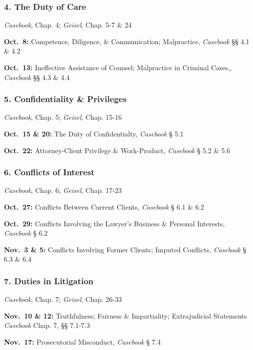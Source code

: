 \documentclass[11pt,letterpaper,twoside]{article}
\begin{document}
\subsubsection{4. The Duty of Care}\label{the-duty-of-care}

\emph{Casebook}, Chap. 4; \emph{Geisel}, Chap. 5-7 \& 24

\textbf{Oct.~8:} Competence, Diligence, \& Communication; Malpractice,
\emph{Casebook} §§ 4.1 \& 4.2

\textbf{Oct.~13:} Ineffective Assistance of Counsel; Malpractice in
Criminal Cases,, \emph{Casebook} §§ 4.3 \& 4.4

\subsubsection{5. Confidentiality \&
Privileges}\label{confidentiality-privileges}

\emph{Casebook}, Chap. 5; \emph{Geisel}, Chap. 15-16

\textbf{Oct.~15 \& 20:} The Duty of Confidentialty, \emph{Casebook} §
5.1

\textbf{Oct.~22:} Attorney-Client Privilege \& Work-Product,
\emph{Casebook} § 5.2 \& 5.6

\subsubsection{6. Conflicts of Interest}\label{conflicts-of-interest}

\emph{Casebook}, Chap. 6; \emph{Geisel}, Chap. 17-23

\textbf{Oct.~27:} Conflicts Between Current Clients, \emph{Casebook} §
6.1 \& 6.2

\textbf{Oct.~29:} Conflicts Involving the Lawyer's Business \& Personal
Interests, \emph{Casebook} § 6.2

\textbf{Nov.~3 \& 5:} Conflicts Involving Former Clients; Imputed
Conflicts, \emph{Casebook} § 6.3 \& 6.4

\subsubsection{7. Duties in Litigation}\label{duties-in-litigation}

\emph{Casebook}, Chap. 7; \emph{Geisel}, Chap. 26-33

\textbf{Nov.~10 \& 12:} Truthfulness; Fairness \& Impartiality;
Extrajudicial Statements \emph{Casebook} Chap. 7, §§ 7.1-7.3

\textbf{Nov.~17:} Prosecutorial Misconduct, \emph{Casebook} § 7.4
\end{document}
